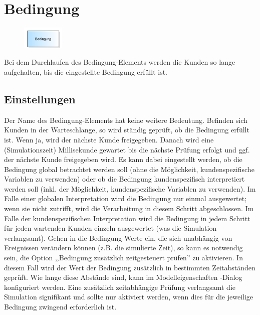 \section{Bedingung}
\label{ref:ModelElementHold}

\begin{figure}
\vspace{-22pt}
\includegraphics[width=2cm]{imageModelElementHold.png}
\vspace{-22pt}
\end{figure}

Bei dem Durchlaufen des Bedingung-Elements werden die Kunden so lange aufgehalten, bis die eingestellte Bedingung erfüllt ist. 

\subsection*{Einstellungen}

Der Name des Bedingung-Elements hat keine weitere Bedeutung. Befinden sich Kunden in der Warteschlange, so wird ständig geprüft,
ob die Bedingung erfüllt ist. Wenn ja, wird der nächste Kunde freigegeben. Danach wird eine (Simulationszeit) Millisekunde gewartet bis die nächste
Prüfung erfolgt und ggf. der nächste Kunde freigegeben wird. Es kann dabei eingestellt werden, ob die Bedingung global betrachtet werden soll
(ohne die Möglichkeit, kundenspezifische Variablen zu verwenden) oder ob die Bedingung kundenspezifisch interpretiert werden soll (inkl. der
Möglichkeit, kundenspezifische Variablen zu verwenden). Im Falle einer globalen Interpretation wird die Bedingung nur einmal ausgewertet; wenn
sie nicht zutrifft, wird die Verarbeitung in diesem Schritt abgeschlossen. Im Falle der kundenspezifischen Interpretation wird die Bedingung
in jedem Schritt für jeden wartenden Kunden einzeln ausgewertet (was die Simulation verlangsamt).
Gehen in die Bedingung Werte ein, die sich unabhängig von Ereignissen verändern können (z.B. die simulierte Zeit), so kann es notwendig sein,
die Option ,,Bedingung zusätzlich zeitgesteuert prüfen'' zu aktivieren. In diesem Fall wird der Wert der Bedingung zusätzlich in bestimmten
Zeitabständen geprüft. Wie lange diese Abstände sind, kann im Modelleigenschaften -Dialog konfiguriert
werden. Eine zusätzlich zeitabhängige Prüfung verlangsamt die Simulation signifikant und sollte nur aktiviert werden, wenn dies für die
jeweilige Bedingung zwingend erforderlich ist. 


